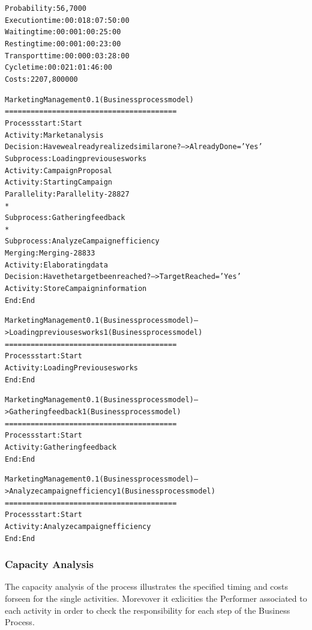 
\begin{alltt}
Probability:   56,7000%
Execution time:  00:018:07:50:00
Waiting time:  00:001:00:25:00
Resting time:  00:001:00:23:00
Transport time:  00:000:03:28:00
Cycle time:  00:021:01:46:00
Costs:  2207,800000

Marketing Management 0.1 (Business process model)
========================================
Process start: Start
Activity: Market analysis
Decision: Have we already realized similar one? --> AlreadyDone = 'Yes'
Subprocess: Loading previouses works
Activity: Campaign Proposal
Activity: Starting Campaign
Parallelity: Parallelity-28827
    *
    Subprocess: Gathering feedback
    *
    Subprocess: Analyze Campaign efficiency
Merging: Merging-28833
Activity: Elaborating data
Decision: Have the target been reached? --> TargetReached = 'Yes'
Activity: Store Campaign information
End: End

Marketing Management 0.1 (Business process model) --> Loading previouses works 1 (Business process model)
========================================
Process start: Start
Activity: Loading Previouses works
End: End

Marketing Management 0.1 (Business process model) --> Gathering feedback 1 (Business process model)
========================================
Process start: Start
Activity: Gathering feedback
End: End

Marketing Management 0.1 (Business process model) --> Analyze campaign efficiency 1 (Business process model)
========================================
Process start: Start
Activity: Analyze campaign efficiency
End: End
\end{alltt}


\subsubsection{Capacity Analysis}
The capacity analysis of the process illustrates the specified timing and costs forseen for the single activities. Morevover it exlicities the Performer associated to each activity in order to check the responsibility for each step of the Business Process.

